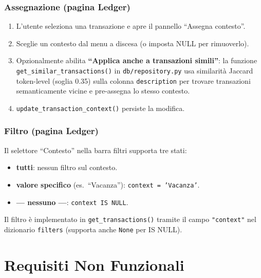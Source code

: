 \documentclass[11pt, a4paper]{article}
\begin{document}
\subsubsection{Assegnazione (pagina Ledger)}

\begin{enumerate}[leftmargin=2em]
  \item L'utente seleziona una transazione e apre il pannello ``Assegna contesto''.
  \item Sceglie un contesto dal menu a discesa (o imposta NULL per rimuoverlo).
  \item Opzionalmente abilita \textbf{``Applica anche a transazioni simili''}: la
        funzione \texttt{get\_similar\_transactions()} in \texttt{db/repository.py}
        usa similarità Jaccard token-level (soglia 0.35) sulla colonna
        \texttt{description} per trovare transazioni semanticamente vicine e
        pre-assegna lo stesso contesto.
  \item \texttt{update\_transaction\_context()} persiste la modifica.
\end{enumerate}

\subsubsection{Filtro (pagina Ledger)}

Il selettore ``Contesto'' nella barra filtri supporta tre stati:
\begin{itemize}[leftmargin=2em]
  \item \textbf{tutti}: nessun filtro sul contesto.
  \item \textbf{valore specifico} (es.\ ``Vacanza''): \texttt{context = 'Vacanza'}.
  \item \textbf{--- nessuno ---}: \texttt{context IS NULL}.
\end{itemize}

Il filtro è implementato in \texttt{get\_transactions()} tramite il campo
\texttt{"context"} nel dizionario \texttt{filters} (supporta anche
\texttt{None} per IS NULL).


\section{Requisiti Non Funzionali}
\end{document}

